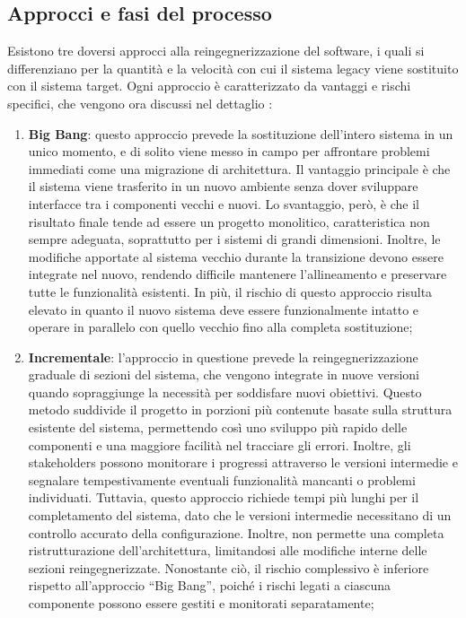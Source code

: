 \subsection{Approcci e fasi del processo}\label{sec:reingegnerizzazione-approcci-fasi}
Esistono tre doversi approcci alla reingegnerizzazione del software, i quali si differenziano per la quantità e la velocità con cui il sistema legacy viene sostituito con il sistema target. Ogni approccio è caratterizzato da vantaggi e rischi specifici, che vengono ora discussi nel dettaglio \cite{Majthoub2018,rosenberg1996software}:
\begin{enumerate}
  \item \textbf{Big Bang}: questo approccio prevede la sostituzione dell'intero sistema in un unico momento, e di solito viene messo in campo per affrontare problemi immediati come una migrazione di architettura. Il vantaggio principale è che il sistema viene trasferito in un nuovo ambiente senza dover sviluppare interfacce tra i componenti vecchi e nuovi. Lo svantaggio, però, è che il risultato finale tende ad essere un progetto monolitico, caratteristica non sempre adeguata, soprattutto per i sistemi di grandi dimensioni. Inoltre, le modifiche apportate al sistema vecchio durante la transizione devono essere integrate nel nuovo, rendendo difficile mantenere l'allineamento e preservare tutte le funzionalità esistenti. In più, il rischio di questo approccio risulta elevato in quanto il nuovo sistema deve essere funzionalmente intatto e operare in parallelo con quello vecchio fino alla completa sostituzione;

  \item \textbf{Incrementale}: l'approccio in questione prevede la reingegnerizzazione graduale di sezioni del sistema, che vengono integrate in nuove versioni quando sopraggiunge la necessità per soddisfare nuovi obiettivi. Questo metodo suddivide il progetto in porzioni più contenute basate sulla struttura esistente del sistema, permettendo così uno sviluppo più rapido delle componenti e una maggiore facilità nel tracciare gli errori. Inoltre, gli stakeholders possono monitorare i progressi attraverso le versioni intermedie e segnalare tempestivamente eventuali funzionalità mancanti o problemi individuati. Tuttavia, questo approccio richiede tempi più lunghi per il completamento del sistema, dato che le versioni intermedie necessitano di un controllo accurato della configurazione. Inoltre, non permette una completa ristrutturazione dell'architettura, limitandosi alle modifiche interne delle sezioni reingegnerizzate. Nonostante ciò, il rischio complessivo è inferiore rispetto all'approccio ``Big Bang'', poiché i rischi legati a ciascuna componente possono essere gestiti e monitorati separatamente;


\end{enumerate}
